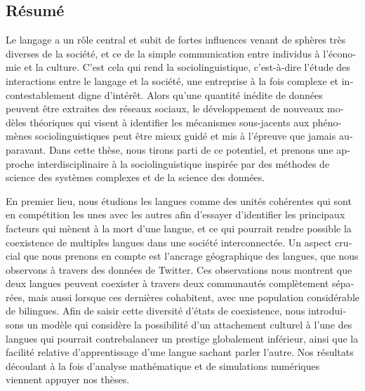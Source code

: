 \documentclass[../thesis.tex]{subfiles}
\begin{document}
\begin{otherlanguage}{french}
\chapter*{Résumé}
Le langage a un rôle central et subit de fortes influences venant de sphères très
diverses de la société, et ce de la simple communication entre individus à l'économie et
la culture. C'est cela qui rend la sociolinguistique, c'est-à-dire l'étude des
interactions entre le langage et la société, une entreprise à la fois complexe et
incontestablement digne d'intérêt. Alors qu'une quantité inédite de données peuvent être
extraites des réseaux sociaux, le développement de nouveaux modèles théoriques qui
visent à identifier les mécanismes sous-jacents aux phénomènes sociolinguistiques peut
être mieux guidé et mis à l'épreuve que jamais auparavant. Dans cette thèse, nous tirons
parti de ce potentiel, et prenons une approche interdisciplinaire à la sociolinguistique
inspirée par des méthodes de science des systèmes complexes et de la science des
données.

En premier lieu, nous étudions les langues comme des unités cohérentes qui sont en
compétition les unes avec les autres afin d'essayer d'identifier les principaux facteurs
qui mènent à la mort d'une langue, et ce qui pourrait rendre possible la coexistence de
multiples langues dans une société interconnectée. Un aspect crucial que nous prenons en
compte est l'ancrage géographique des langues, que nous observons à travers des données
de Twitter. Ces observations nous montrent que deux langues peuvent coexister à travers
deux communautés complètement séparées, mais aussi lorsque ces dernières cohabitent,
avec une population considérable de bilingues. Afin de saisir cette diversité d'états de
coexistence, nous introduisons un modèle qui considère la possibilité d'un attachement
culturel à l'une des langues qui pourrait contrebalancer un prestige globalement
inférieur, ainsi que la facilité relative d'apprentissage d'une langue sachant parler
l'autre. Nos résultats découlant à la fois d'analyse mathématique et de simulations
numériques viennent appuyer nos thèses.


\end{otherlanguage}
\end{document}
